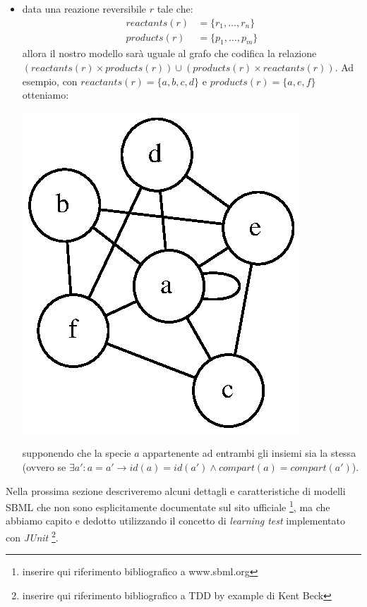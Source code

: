 \begin{itemize}
\item data una reazione reversibile $r$ tale che:
  \begin{displaymath}
    \begin{split} 
      reactants(r) &= \{ r_{1}, \ldots, r_{n} \} \\
      products(r) &= \{ p_{1}, \ldots, p_{m} \}
    \end{split}
  \end{displaymath}
  allora il nostro modello sar\`a uguale al grafo che codifica la
  relazione $(reactants(r) \times products(r)) \cup (products(r)
  \times reactants(r))$. Ad esempio, con $reactants(r) = \{ a, b, c, d
  \}$ e $products(r) = \{a, e, f\}$ otteniamo:

\begin{center}
\includegraphics{images/reversible-reaction-example.dot.eps}
\end{center}
supponendo che la specie $a$ appartenente ad entrambi gli
insiemi sia la stessa (ovvero se $\exists a': a = a' \rightarrow id(a) =
id(a') \wedge compart(a) = compart(a')$).

\end{itemize}

Nella prossima sezione descriveremo alcuni dettagli e caratteristiche
di modelli SBML che non sono esplicitamente documentate sul sito
ufficiale \footnote{inserire qui riferimento bibliografico a
  www.sbml.org}, ma che abbiamo capito e dedotto utilizzando il
concetto di \emph{learning test} implementato con \emph{JUnit}
\footnote{inserire qui riferimento bibliografico a TDD by example di
  Kent Beck}.

